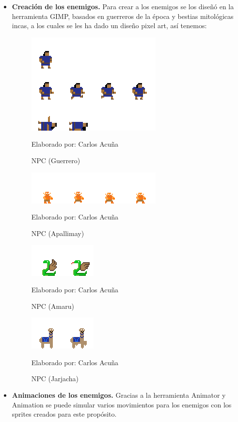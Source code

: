 \documentclass[a4paper, openright, 12pt]{report}
\begin{document}
\begin{itemize}
\item \textbf{Creación de los enemigos.} Para crear a los enemigos se los diseñó en la herramienta GIMP, basados en guerreros de la época y bestias mitológicas incas, a los cuales se les ha dado un diseño pixel art, así tenemos:

\begin{figure}[h]
\captionsetup{justification=centering,margin=2cm}
\includegraphics[scale=3]{T08_01}
\centering
\caption{NPC (Guerrero)}
Elaborado por: Carlos Acuña
\label{fig:T08_01}
\end{figure}

\begin{figure}[h]
\captionsetup{justification=centering,margin=2cm}
\includegraphics[scale=3]{T08_02}
\centering
\caption{NPC (Apallimay)}
Elaborado por: Carlos Acuña
\label{fig:T08_02}
\end{figure}

\begin{figure}[!]
\captionsetup{justification=centering,margin=2cm}
\includegraphics[scale=3]{T08_03}
\centering
\caption{NPC (Amaru)}
Elaborado por: Carlos Acuña
\label{fig:T08_03}
\end{figure}

\begin{figure}[!]
\captionsetup{justification=centering,margin=2cm}
\includegraphics[scale=3]{T08_04}
\centering
\caption{NPC (Jarjacha)}
Elaborado por: Carlos Acuña
\label{fig:T08_04}
\end{figure}
\clearpage
\item \textbf{Animaciones de los enemigos.} Gracias a la herramienta Animator y Animation se puede simular varios movimientos para los enemigos con los sprites creados para este propósito.


\end{itemize}
\end{document}
